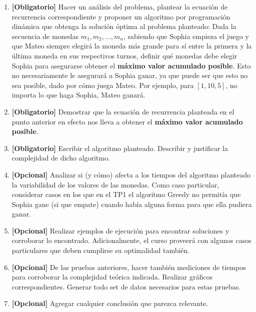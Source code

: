 \begin{enumerate}
    \item \textbf{[Obligatorio]} Hacer un análisis del problema, plantear la ecuación de recurrencia correspondiente y proponer un algoritmo por programación dinámica que obtenga la solución óptima al problema planteado: Dada la secuencia de monedas $m_1, m_2, \dots, m_n$, sabiendo que Sophia empieza el juego y que Mateo siempre elegirá la moneda más grande para sí entre la primera y la última moneda en sus respectivos turnos, definir qué monedas debe elegir Sophia para asegurarse obtener el \textbf{máximo valor acumulado posible}. Esto no necesariamente le asegurará a Sophia ganar, ya que puede ser que esto no sea posible, dado por cómo juega Mateo. Por ejemplo, para $[1, 10, 5]$, no importa lo que haga Sophia, Mateo ganará.

    \item \textbf{[Obligatorio]} Demostrar que la ecuación de recurrencia planteada en el punto anterior en efecto nos lleva a obtener el \textbf{máximo valor acumulado posible}.

    \item \textbf{[Obligatorio]} Escribir el algoritmo planteado. Describir y justificar la complejidad de dicho algoritmo.

    \item \textbf{[Opcional]} Analizar si (y cómo) afecta a los tiempos del algoritmo planteado la variabilidad de los valores de las monedas. Como caso particular, considerar casos en los que en el TP1 el algoritmo Greedy no permitía que Sophia gane (si que empate) cuando había alguna forma para que ella pudiera ganar.

    \item \textbf{[Opcional]} Realizar ejemplos de ejecución para encontrar soluciones y corroborar lo encontrado. Adicionalmente, el curso proveerá con algunos casos particulares que deben cumplirse su optimalidad también.

    \item \textbf{[Opcional]} De las pruebas anteriores, hacer también mediciones de tiempos para corroborar la complejidad teórica indicada. Realizar gráficos correspondientes. Generar todo set de datos necesarios para estas pruebas.

    \item \textbf{[Opcional]} Agregar cualquier conclusión que parezca relevante.
\end{enumerate}
\newpage